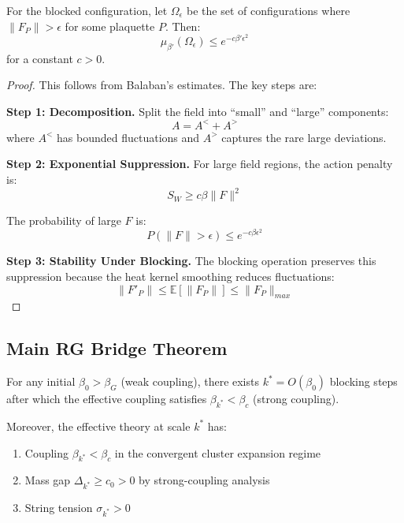 \begin{theorem}
\label{thm:large-field-app72}
For the blocked configuration, let $\Omega_\epsilon$ be the set of configurations 
where $\|F_P\| > \epsilon$ for some plaquette $P$. Then:
\[
\mu_{\beta'}(\Omega_\epsilon) \leq e^{-c\beta'\epsilon^2}
\]
for a constant $c > 0$.
\end{theorem}

\begin{proof}
This follows from Balaban's estimates. The key steps are:

\textbf{Step 1: Decomposition.}
Split the field into ``small'' and ``large'' components:
\[
A = A^{<} + A^{>}
\]
where $A^{<}$ has bounded fluctuations and $A^{>}$ captures the rare large 
deviations.

\textbf{Step 2: Exponential Suppression.}
For large field regions, the action penalty is:
\[
S_W \geq c \beta \|F\|^2
\]

The probability of large $F$ is:
\[
P(\|F\| > \epsilon) \leq e^{-c\beta\epsilon^2}
\]

\textbf{Step 3: Stability Under Blocking.}
The blocking operation preserves this suppression because the heat kernel 
smoothing reduces fluctuations:
\[
\|F'_P\| \leq \mathbb{E}[\|F_P\|] \leq \|F_P\|_{max}
\]
\end{proof}

\subsection{Main RG Bridge Theorem}

\begin{theorem}
\label{thm:rg-bridge}
\label{thm:hierarchical-confinement}
For any initial $\beta_0 > \beta_G$ (weak coupling), there exists $k^* = O(\beta_0)$ 
blocking steps after which the effective coupling satisfies $\beta_{k^*} < \beta_c$ 
(strong coupling).

Moreover, the effective theory at scale $k^*$ has:
\begin{enumerate}[label=(\roman*)]
\item Coupling $\beta_{k^*} < \beta_c$ in the convergent cluster expansion regime
\item Mass gap $\Delta_{k^*} \geq c_0 > 0$ by strong-coupling analysis
\item String tension $\sigma_{k^*} > 0$
\end{enumerate}
\end{theorem}

